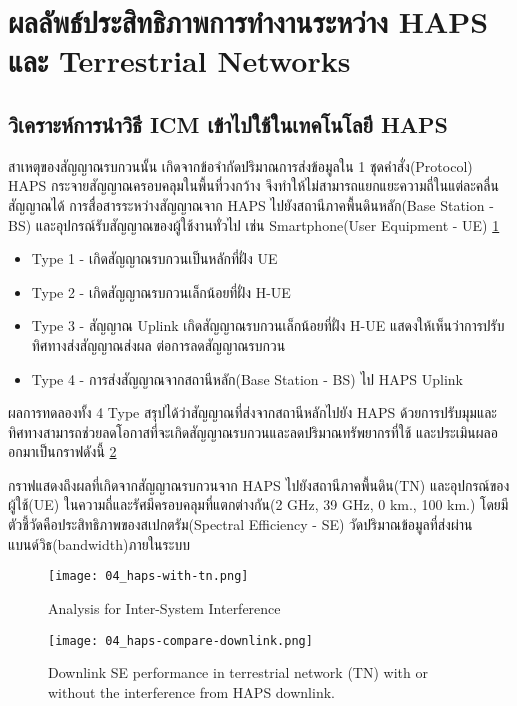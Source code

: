 \section{ผลลัพธ์ประสิทธิภาพการทำงานระหว่าง HAPS และ Terrestrial Networks}

\subsection{วิเคราะห์การนำวิธี ICM เข้าไปใช้ในเทคโนโลยี HAPS}

\begin{multicols}{2}
สาเหตุของสัญญาณรบกวนนั้น เกิดจากข้อจำกัดปริมาณการส่งข้อมูลใน 1 ชุดคำสั่ง(Protocol)
HAPS กระจายสัญญาณครอบคลุมในพื้นที่วงกว้าง จึงทำให้ไม่สามารถแยกแยะความถี่ในแต่ละคลื่นสัญญาณได้
การสื่อสารระหว่างสัญญาณจาก HAPS ไปยังสถานีภาคพื้นดินหลัก(Base Station - BS)
และอุปกรณ์รับสัญญาณของผู้ใช้งานทั่วไป เช่น Smartphone(User Equipment - UE) \ref{fig:04-haps-with-tn}

\begin{itemize}
    \item Type 1 - เกิดสัญญาณรบกวนเป็นหลักที่ฝั่ง UE
    \item Type 2 - เกิดสัญญาณรบกวนเล็กน้อยที่ฝั่ง H-UE
    \item Type 3 - สัญญาณ Uplink เกิดสัญญาณรบกวนเล็กน้อยที่ฝั่ง H-UE แสดงให้เห็นว่าการปรับทิศทางส่งสัญญาณส่งผล
    ต่อการลดสัญญาณรบกวน
    \item Type 4 - การส่งสัญญาณจากสถานีหลัก(Base Station - BS) ไป HAPS Uplink
\end{itemize}

ผลการทดลองทั้ง 4 Type สรุปได้ว่าสัญญาณที่ส่งจากสถานีหลักไปยัง HAPS ด้วยการปรับมุมและทิศทางสามารถช่วยลดโอกาสที่จะเกิดสัญญาณรบกวนและลดปริมาณทรัพยากรที่ใช้ และประเมินผลออกมาเป็นกราฟดังนี้
\ref{fig:04-haps-compare-downlink}

กราฟแสดงถึงผลที่เกิดจากสัญญาณรบกวนจาก HAPS ไปยังสถานีภาคพื้นดิน(TN) และอุปกรณ์ของผู้ใช้(UE)
ในความถี่และรัศมีครอบคลุมที่แตกต่างกัน(2 GHz, 39 GHz, 0 km., 100 km.) โดยมีตัวชี้วัดคือประสิทธิภาพของสเปกตรัม(Spectral Efficiency - SE)
วัดปริมาณข้อมูลที่ส่งผ่านแบนด์วิธ(bandwidth)ภายในระบบ

\columnbreak


\begin{figure}[H]
\centering
\texttt{[image: 04\_haps-with-tn.png]}
\caption[Interference Type]{Analysis for Inter-System Interference} \label{fig:04-haps-with-tn} 
\end{figure}

\begin{figure}[H]
\centering
\texttt{[image: 04\_haps-compare-downlink.png]}
\caption[HAPS compare with downlink]{Downlink SE performance in terrestrial network (TN) with or without
the interference from HAPS downlink.} \label{fig:04-haps-compare-downlink}
\end{figure}
\end{multicols}

